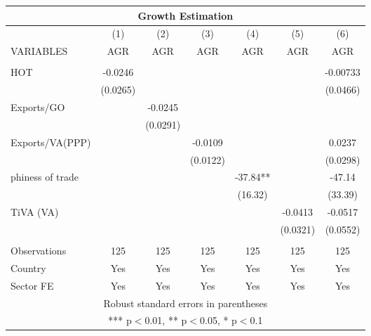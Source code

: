 \documentclass[]{article}
\begin{document}
\begin{tabular}{lcccccc}
\multicolumn{7}{c}{Growth Estimation} \\ \hline
 & (1) & (2) & (3) & (4) & (5) & (6) \\
VARIABLES & AGR & AGR & AGR & AGR & AGR & AGR \\ \hline
 &  &  &  &  &  &  \\
HOT & -0.0246 &  &  &  &  & -0.00733 \\
 & (0.0265) &  &  &  &  & (0.0466) \\
Exports/GO &  & -0.0245 &  &  &  &  \\
 &  & (0.0291) &  &  &  &  \\
Exports/VA(PPP) &  &  & -0.0109 &  &  & 0.0237 \\
 &  &  & (0.0122) &  &  & (0.0298) \\
phiness of trade &  &  &  & -37.84** &  & -47.14 \\
 &  &  &  & (16.32) &  & (33.39) \\
TiVA (VA) &  &  &  &  & -0.0413 & -0.0517 \\
 &  &  &  &  & (0.0321) & (0.0552) \\
 &  &  &  &  &  &  \\
Observations & 125 & 125 & 125 & 125 & 125 & 125 \\
Country & Yes & Yes & Yes & Yes & Yes & Yes \\
 Sector FE & Yes & Yes & Yes & Yes & Yes & Yes \\ \hline
\multicolumn{7}{c}{ Robust standard errors in parentheses} \\
\multicolumn{7}{c}{ *** p$<$0.01, ** p$<$0.05, * p$<$0.1} \\
\end{tabular}
\end{document}
